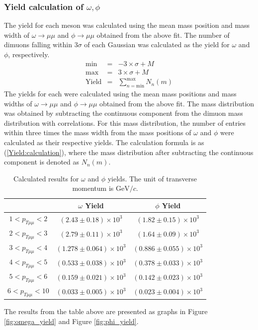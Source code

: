         \subsubsection{Yield calculation of $\omega,\phi$} 
        \label{Analysis:Dimuon:Yieldcal}
            The yield for each meson was calculated using the mean mass position and mass width of $\omega \rightarrow \mu\mu$ and $\phi \rightarrow \mu\mu$ obtained from the above fit. The number of dimuons falling within 3$\sigma$ of each Gaussian was calculated as the yield for $\omega$ and $\phi$, respectively.
            \begin{eqnarray}
                \mathrm{min} &=&  -3 \times \sigma + M \\
                \mathrm{max} &=&  3 \times \sigma + M \\
                \mathrm{Yield} &=& \sum_{n=\mathrm{min}}^{\mathrm{max}} N_n(m)
                \label{Yield:calculation}
            \end{eqnarray}
            The yields for each were calculated using the mean mass positions and mass widths of \(\omega \rightarrow \mu\mu\) and \(\phi \rightarrow \mu\mu\) obtained from the above fit. The mass distribution was obtained by subtracting the continuous component from the dimuon mass distribution with correlations. For this mass distribution, the number of entries within three times the mass width from the mass positions of \(\omega\) and \(\phi\) were calculated as their respective yields. The calculation formula is as (\ref{Yield:calculation}), where the mass distribution after subtracting the continuous component is denoted as \(N_n(m)\).
            \begin{table}[htbp]
                \centering
                \caption{Calculated results for $\omega$ and $\phi$ yields. The unit of transverse momentum is $\mathrm{GeV}/c$.}
                \begin{tabular}{|c||c|c|}
                    \hline
                    & $\omega$ Yield & $\phi$ Yield \\ \hline \hline
                    $1 < p_{T\mu\mu} < 2$ &$(2.43\pm0.18)\times10^3$& $(1.82\pm0.15)\times10^3$\\ \hline
                    $2 < p_{T\mu\mu} < 3$ &$(2.79\pm0.11)\times10^3$& $(1.64\pm0.09)\times10^3$\\ \hline
                    $3 < p_{T\mu\mu} < 4$ &$(1.278\pm0.064)\times10^3$& $(0.886\pm0.055)\times10^3$\\ \hline
                    $4 < p_{T\mu\mu} < 5$ &$(0.533\pm0.038)\times10^3$& $(0.378\pm0.033)\times10^3$\\ \hline
                    $5 < p_{T\mu\mu} < 6$ &$(0.159\pm0.021)\times10^3$& $(0.142\pm0.023)\times10^3$\\ \hline
                    $6 < p_{T\mu\mu} < 10$ &$(0.033\pm0.005)\times10^3$& $(0.023\pm0.004)\times10^3$\\ \hline     
                \end{tabular}
                \label{Analysis:Dimuon:Yield:Results}
            \end{table}
            The results from the table above are presented as graphs in Figure \ref{fig:omega_yield} and Figure \ref{fig:phi_yield}.

